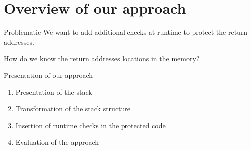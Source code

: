 \documentclass{beamer}
\begin{document}
\section{Overview of our approach}
\label{sec:Overview of our approach}




\begin{frame}[c]{Problematic}
	We want to add additional checks at runtime to protect the return addresses. \\
	\begin{center}
		{\Large How do we know the return addresses locations in the memory?}	
		\break
		\break
		\visible<2>{\textcolor{red}{$\Rightarrow$~Modify the memory structure to have an easy way to distinguish return addresses locations}}
	\end{center}
\end{frame}

\begin{frame}[c]{Presentation of our approach}
	\begin{enumerate}\itemsep16pt
		\item Presentation of the stack
		\item Transformation of the stack structure
		\item Insertion of runtime checks in the protected code
		\item Evaluation of the approach
	\end{enumerate}
\end{frame}
\end{document}
